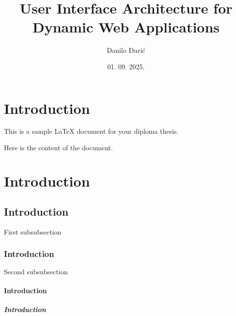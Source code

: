 \documentclass[12pt,a4paper]{article}
\title{User Interface Architecture for Dynamic Web Applications}
\author{Danilo Đurić}
\date{01. 09. 2025. }
\begin{document}
\maketitle
\tableofcontents

\section{Introduction}

This is a sample LaTeX document for your diploma thesis.

Here is the content of the document.


\section{Introduction}

\subsection{Introduction}

First subsubsection

\subsubsection{Introduction}

Second subsubsection

\paragraph{Introduction}

\subparagraph{Introduction}
\end{document}
